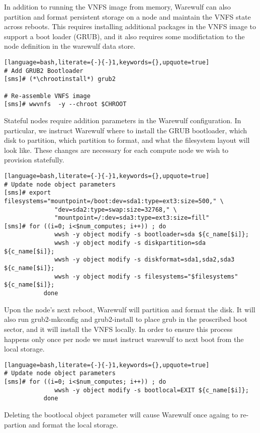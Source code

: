 In addition to running the VNFS image from memory, Warewulf can also partition
and format persistent storage on a node and maintain the VNFS state across
reboots. This requires installing additional packages in the VNFS image to
support a boot loader (GRUB), and it also requires some modifictation to the
node definition in the warewulf data store. 

\begin{lstlisting}[language=bash,literate={-}{-}1,keywords={},upquote=true]
# Add GRUB2 Bootloader
[sms]# (*\chrootinstall*) grub2

# Re-assemble VNFS image
[sms]# wwvnfs  -y --chroot $CHROOT
\end{lstlisting}

Stateful nodes require addition parameters in the Warewulf configuration. In
particular, we instruct Warewulf where to install the GRUB bootloader, which
disk to partition, which partition to format, and what the filesystem layout
will look like. These changes are necessary for each compute node we wish to
provision statefully.

\begin{lstlisting}[language=bash,literate={-}{-}1,keywords={},upquote=true]
# Update node object parameters
[sms]# export filesystems="mountpoint=/boot:dev=sda1:type=ext3:size=500," \
              "dev=sda2:type=swap:size=32768," \
              "mountpoint=/:dev=sda3:type=ext3:size=fill"
[sms]# for ((i=0; i<$num_computes; i++)) ; do 
              wwsh -y object modify -s bootloader=sda ${c_name[$i]};
              wwsh -y object modify -s diskpartition=sda ${c_name[$i]};
              wwsh -y object modify -s diskformat=sda1,sda2,sda3 ${c_name[$i]};
              wwsh -y object modify -s filesystems="$filesystems" ${c_name[$i]};
           done
\end{lstlisting}

Upon the node's next reboot, Warewulf will partition and format the disk. It
will also run grub2-mkconfig and grub2-install to place grub in the proscribed
boot sector, and it will install the VNFS locally. In order to ensure this 
process happens only once per node we must instruct warewulf to next boot from 
the local storage.

\begin{lstlisting}[language=bash,literate={-}{-}1,keywords={},upquote=true]
# Update node object parameters
[sms]# for ((i=0; i<$num_computes; i++)) ; do 
              wwsh -y object modify -s bootlocal=EXIT ${c_name[$i]};
           done
\end{lstlisting}

Deleting the bootlocal object parameter will cause Warewulf once againg to
re-partion and format the local storage.
